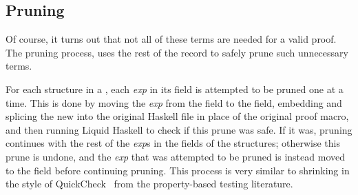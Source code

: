 
\subsection{Pruning}


Of course, it turns out that not all of these terms are needed for a
valid proof. The pruning process, uses the rest of the 
record to safely prune such unnecessary terms.

For each  structure in a \LangBTerm, each \textit{exp} in its  field is attempted to be pruned one at a time.
This is done by moving the \textit{exp} from the  field to the  field, embedding and splicing the new \LangBTerm into the original Haskell file in place of the original proof macro, and then running Liquid Haskell to check if this prune was safe.
If it was, pruning continues with the rest of the \textit{exp}s in the  fields of the  structures; otherwise this prune is undone, and the \textit{exp} that was attempted to be pruned is instead moved to the  field before continuing pruning.
%
This process is very similar to shrinking in the style of
QuickCheck~\cite{ClaessenH00} from the property-based testing
literature.

